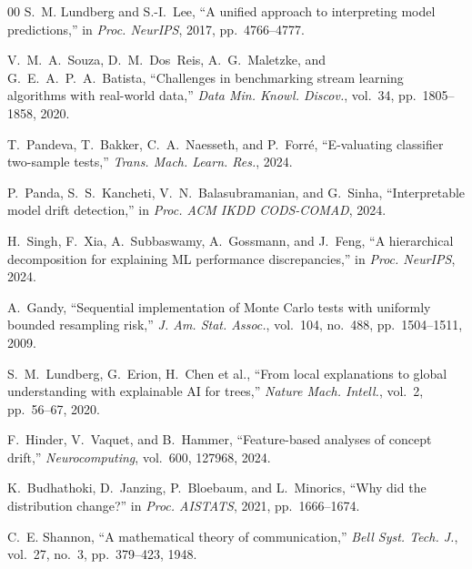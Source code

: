 \documentclass[conference,a4paper]{IEEEtran}
\begin{document}
{\begin{thebibliography}{00}
 S.~M. Lundberg and S.-I.~Lee, ``A unified approach to interpreting model predictions,'' in \textit{Proc. NeurIPS}, 2017, pp.~4766--4777.

 V.~M.~A.~Souza, D.~M.~Dos~Reis, A.~G.~Maletzke, and G.~E.~A.~P.~A.~Batista, ``Challenges in benchmarking stream learning algorithms with real-world data,'' \textit{Data Min. Knowl. Discov.}, vol.~34, pp.~1805--1858, 2020.

 T.~Pandeva, T.~Bakker, C.~A.~Naesseth, and P.~Forr\'{e}, ``E-valuating classifier two-sample tests,'' \textit{Trans. Mach. Learn. Res.}, 2024.

 P.~Panda, S.~S.~Kancheti, V.~N.~Balasubramanian, and G.~Sinha, ``Interpretable model drift detection,'' in \textit{Proc. ACM IKDD CODS-COMAD}, 2024.

 H.~Singh, F.~Xia, A.~Subbaswamy, A.~Gossmann, and J.~Feng, ``A hierarchical decomposition for explaining {ML} performance discrepancies,'' in \textit{Proc. NeurIPS}, 2024.

 A.~Gandy, ``Sequential implementation of Monte Carlo tests with uniformly bounded resampling risk,'' \textit{J. Am. Stat. Assoc.}, vol.~104, no.~488, pp.~1504--1511, 2009.

 S.~M.~Lundberg, G.~Erion, H.~Chen et al., ``From local explanations to global understanding with explainable AI for trees,'' \textit{Nature Mach. Intell.}, vol.~2, pp.~56--67, 2020.

 F.~Hinder, V.~Vaquet, and B.~Hammer, ``Feature-based analyses of concept drift,'' \textit{Neurocomputing}, vol.~600, 127968, 2024.

 K.~Budhathoki, D.~Janzing, P.~Bloebaum, and L.~Minorics, ``Why did the distribution change?'' in \textit{Proc. AISTATS}, 2021, pp.~1666--1674.

 C.~E. Shannon, ``A mathematical theory of communication,'' \textit{Bell Syst. Tech. J.}, vol.~27, no.~3, pp.~379--423, 1948.
\end{thebibliography}
}
\end{document}
